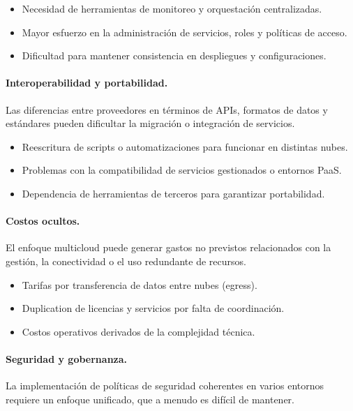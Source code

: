 {            \begin{itemize}
                \item Necesidad de herramientas de monitoreo y orquestación centralizadas.
                \item Mayor esfuerzo en la administración de servicios, roles y políticas de acceso.
                \item Dificultad para mantener consistencia en despliegues y configuraciones.
            \end{itemize}
            
            \paragraph{Interoperabilidad y portabilidad.}
            Las diferencias entre proveedores en términos de APIs, formatos de datos y estándares pueden dificultar la migración o integración de servicios.
            
            \begin{itemize}
                \item Reescritura de scripts o automatizaciones para funcionar en distintas nubes.
                \item Problemas con la compatibilidad de servicios gestionados o entornos PaaS.
                \item Dependencia de herramientas de terceros para garantizar portabilidad.
            \end{itemize}
            
            \paragraph{Costos ocultos.}
            El enfoque multicloud puede generar gastos no previstos relacionados con la gestión, la conectividad o el uso redundante de recursos.
            
            \begin{itemize}
                \item Tarifas por transferencia de datos entre nubes (egress).
                \item Duplication de licencias y servicios por falta de coordinación.
                \item Costos operativos derivados de la complejidad técnica.
            \end{itemize}
            
            \paragraph{Seguridad y gobernanza.}
            La implementación de políticas de seguridad coherentes en varios entornos requiere un enfoque unificado, que a menudo es difícil de mantener.
            
}
